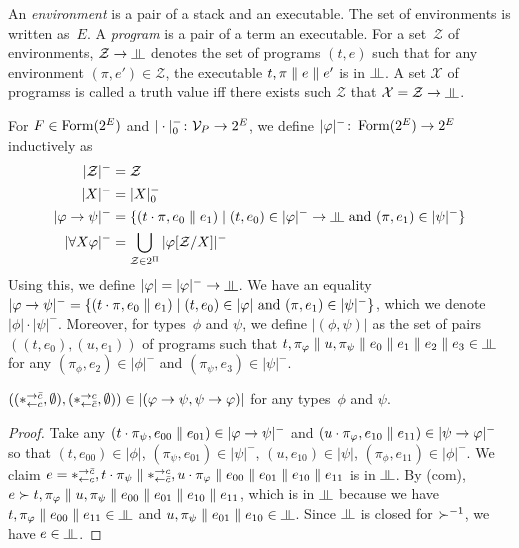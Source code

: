 An \textit{environment} is a pair of a stack and an executable.
The set of environments is written as~$E$.
A \textit{program} is a pair of a term an executable.
For a set~$\mathcal Z$ of environments, $\mathcal Z\imp\bbot$ denotes
the set of programs $(t,e)$ such that
for any environment $(\pi,e')\in \mathcal Z$,
the executable $t,\pi\parallel e \parallel e'$ is in $\bbot$.
A set $\mathcal X$ of programss is called a truth value
iff there exists
such $\mathcal Z$ that $\mathcal X = \mathcal Z\imp \bbot$.

\renewcommand{\sem}[1]{|{#1}|}
\newcommand{\nsem}[1]{\sem{#1}^-}
\newcommand{\sempair}[1]{\sem{(#1)}}
For $F\in\mathop{\text{Form}}(2^E)$ and $|\cdot|^-_0\colon\mathcal V_P\rightarrow 2^E$,
we define $\nsem{\phi}\colon \form(2^E)\rightarrow
2^E$ inductively as
\begin{align*}
 \nsem{\mathcal Z} &= \mathcal Z \\
 \nsem{X}&= |X|_0^- \\
 \nsem{\phi\imp\psi}&=
 \{(t\cdot\pi, e_0\conc e_1)\mid
 (t,e_0)\in\nsem\phi\rightarrow\bbot \text{ and }(\pi,e_1)\in\nsem\psi\}
 \\
 \nsem{\forall X\phi}&=
 \bigcup_{\mathcal Z\in 2^\Pi} \nsem{\phi[\mathcal Z/X]}
\end{align*}
Using this, we define $\sem \phi=\nsem{\phi}\rightarrow\bbot$.
We have an equality
$\nsem{\phi\imp\psi} = \{(t\cdot\pi, e_0\conc e_1)\mid
(t,e_0)\in\sem\phi\text{ and }(\pi,e_1)\in\nsem\psi\}$, which we denote
$\sem{\phi}\cdot\nsem{\psi}$.
Moreover, for types~$\phi$ and $\psi$, we define $\sempair{\phi,\psi}$
as the set of pairs $((t,e_0),(u,e_1))$ of programs such
that
$t,\pi_\phi\conc u,\pi_\psi\conc e_0\conc e_1\conc e_2\conc e_3
\in\bbot$ for any $(\pi_\phi,e_2)\in\nsem\phi$
and $(\pi_\psi,e_3)\in\nsem\psi$.

\begin{proposition}
 \label{comod-type}
 $((\comodL,\emptyset), (\comodR,\emptyset))\in\sempair{\phi\imp\psi,\psi\imp\phi}$
 for any types~$\phi$ and $\psi$.
\end{proposition}
\begin{proof}
 Take any $(t\cdot\pi_\psi,e_{00}\conc e_{01})\in\nsem{\phi\imp\psi}$
 and $(u\cdot\pi_\phi,e_{10}\conc e_{11})\in\nsem{\psi\imp\phi}$ so that
 $(t, e_{00})\in\sem{\phi}$, $(\pi_\psi,e_{01})\in\nsem{\psi}$,
 $(u, e_{10})\in\sem{\psi}$, $(\pi_\phi,e_{11})\in\nsem{\phi}$.
 We claim $e=\ast^{\rightarrow {\bar{c}}}_{\leftarrow{c}},t\cdot\pi_\psi\parallel\ast^{\rightarrow {c}}_{\leftarrow{\bar{c}}},u\cdot\pi_\varphi\parallel
 e_{00}\parallel e_{01}\parallel e_{10}\parallel e_{11}$ is in
 $\bbot$.
 By (com), $e\succ t,\pi_\varphi\parallel u,\pi_\psi\parallel e_{00}\parallel
 e_{01}\parallel e_{10}\parallel e_{11}$, which is in $\bbot$ because
 we have $t,\pi_\phi\conc e_{00}\conc e_{11}\in\bbot$ and
 $u,\pi_\psi\conc e_{01}\conc e_{10}\in\bbot$.
 Since $\bbot$ is closed for $\succ^{-1}$,
 we have $e\in\bbot$.
\end{proof}


